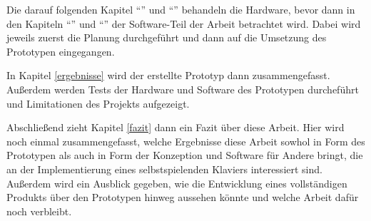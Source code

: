 Die darauf folgenden Kapitel \enquote{} und \enquote{} behandeln die Hardware, bevor dann in den Kapiteln \enquote{} und \enquote{} der Software-Teil der Arbeit betrachtet wird.
Dabei wird jeweils zuerst die Planung durchgeführt und dann auf die Umsetzung des Prototypen eingegangen.

In Kapitel \ref{ergebnisse} wird der erstellte Prototyp dann zusammengefasst.
Außerdem werden Tests der Hardware und Software des Prototypen durcheführt und Limitationen des Projekts aufgezeigt.

Abschließend zieht Kapitel \ref{fazit} dann ein Fazit über diese Arbeit.
Hier wird noch einmal zusammengefasst, welche Ergebnisse diese Arbeit sowhol in Form des Prototypen als auch in Form der Konzeption und Software für Andere bringt, die an der Implementierung eines selbstspielenden Klaviers interessiert sind.
Außerdem wird ein Ausblick gegeben, wie die Entwicklung eines vollständigen Produkts über den Prototypen hinweg aussehen könnte und welche Arbeit dafür noch verbleibt.
